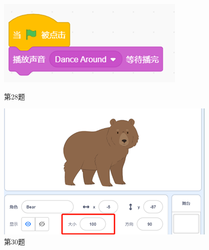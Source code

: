 \documentclass[10.5pt, a4paper]{article}
\begin{document}
\begin{figure}[htbp]
\begin{minipage}[t]{.23\textwidth}
\begin{minipage}[t]{.23\textwidth}
            \end{minipage}
            \begin{minipage}[t]{.7\textwidth}
                \centering
                \includegraphics[width=\textwidth]{28-2.png}
            \end{minipage}
            \caption*{第28题}
        \end{minipage}
        \begin{minipage}[t]{.23\textwidth}
            \centering
            \includegraphics[width=\textwidth]{30.png}
            \caption*{第30题}
        \end{minipage}
        \begin{minipage}[t]{.13\textwidth}
            \centering

\end{minipage}
\end{figure}
\end{document}
